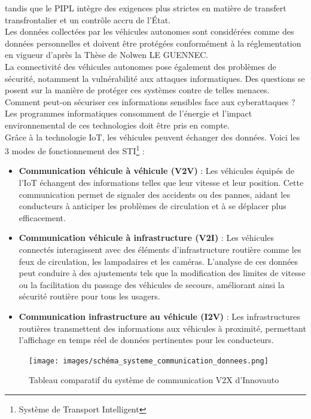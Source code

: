 tandis que le PIPL intègre des exigences plus strictes en matière de transfert transfrontalier et un contrôle accru de l’État.\\
Les données collectées par les véhicules autonomes sont considérées comme des données personnelles et doivent être protégées conformément à la réglementation en vigueur d'après la Thèse de Nolwen LE GUENNEC\cite{le_gennec_machine_2023}.\\
La connectivité des véhicules autonomes pose également des problèmes de sécurité, notamment la vulnérabilité aux attaques informatiques. Des questions se posent sur la manière de protéger ces systèmes contre de telles menaces. Comment peut-on sécuriser ces informations sensibles face aux cyberattaques ?\\
Les programmes informatiques consomment de l’énergie et l'impact environnemental de ces technologies doit être pris en compte.\\
Grâce à la technologie IoT, les véhicules peuvent échanger des données. Voici les 3 modes de fonctionnement des STI\footnote{Système de Transport Intelligent} :
\begin{itemize}
    \item \textbf{Communication véhicule à véhicule (V2V)} : Les véhicules équipés de l’IoT échangent des informations telles que leur vitesse et leur position. Cette communication permet de signaler des accidents ou des pannes, aidant les conducteurs à anticiper les problèmes de circulation et à se déplacer plus efficacement.
    \item \textbf{Communication véhicule à infrastructure (V2I)} : Les véhicules connectés interagissent avec des éléments d’infrastructure routière comme les feux de circulation, les lampadaires et les caméras. L’analyse de ces données peut conduire à des ajustements tels que la modification des limites de vitesse ou la facilitation du passage des véhicules de secours, améliorant ainsi la sécurité routière pour tous les usagers.
    \item \textbf{Communication infrastructure au véhicule (I2V)} : Les infrastructures routières transmettent des informations aux véhicules à proximité, permettant l’affichage en temps réel de données pertinentes pour les conducteurs.
\end{itemize}

\begin{figure}[H]
    \centering
    \texttt{[image: images/schéma\_systeme\_communication\_donnees.png]} 
    \caption{Tableau comparatif du système de communication V2X d'Innovauto}
\end{figure}

